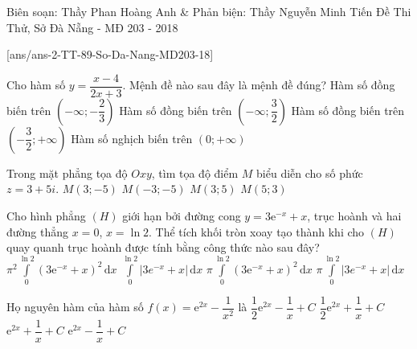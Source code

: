 \begin{name}
{Biên soạn: Thầy Phan Hoàng Anh \& Phản biện: Thầy Nguyễn Minh Tiến}
{Đề Thi Thử, Sở Đà Nẵng - MĐ 203 - 2018}
\end{name}
\setcounter{ex}{0}
[ans/ans-2-TT-89-So-Da-Nang-MD203-18]
\begin{ex}%
	Cho hàm số $y=\dfrac{x-4}{2x+3}$. Mệnh đề nào sau đây là mệnh đề đúng?
	\choice
	{Hàm số đồng biến trên $\left(-\infty;-\dfrac{2}{3}\right)$}
	{Hàm số đồng biến trên $\left(-\infty;\dfrac{3}{2}\right)$}
	{\True Hàm số đồng biến trên $\left(-\dfrac{3}{2};+\infty\right)$}
	{Hàm số nghịch biến trên $(0;+\infty)$}
\end{ex}
\begin{ex}%
	Trong mặt phẳng tọa độ $Oxy$, tìm tọa độ điểm $M$ biểu diễn cho số phức $z=3+5i$. 
	\choice
	{$M(3;-5)$}
	{$M(-3;-5)$}
	{\True $M(3;5)$}
	{$M(5;3)$}
\end{ex}

\begin{ex}%
	Cho hình phẳng $(H)$ giới hạn bởi đường cong $y=3\mathrm{e}^{-x}+x$, trục hoành và hai đường thẳng $x=0$, $x=\ln2$. Thể tích khối tròn xoay tạo thành khi cho $(H)$ quay quanh trục hoành được tính bằng công thức nào sau đây?
	\choice
	{$\pi^2\displaystyle\int\limits_0^{\ln2}\left(3\mathrm{e}^{-x}+x\right)^2\mathrm{\,d}x$}
	{$\displaystyle\int\limits_0^{\ln2}\left|3e^{-x}+x\right|\mathrm{\,d}x$}
	{\True $\pi\displaystyle\int\limits_0^{\ln2}\left(3\mathrm{e}^{-x}+x\right)^2\mathrm{\,d}x$}
	{$\pi\displaystyle\int\limits_0^{\ln2}\left|3e^{-x}+x\right|\mathrm{\,d}x$}
\end{ex}

\begin{ex}%
Họ nguyên hàm của hàm số $f(x)=\mathrm{e}^{2x}-\dfrac{1}{x^2}$ là
\choice
{$\dfrac{1}{2}\mathrm{e}^{2x}-\dfrac{1}{x}+C$}
{\True $\dfrac{1}{2}\mathrm{e}^{2x}+\dfrac{1}{x}+C$}
{$\mathrm{e}^{2x}+\dfrac{1}{x}+C$}
{$\mathrm{e}^{2x}-\dfrac{1}{x}+C$}
\end{ex}

